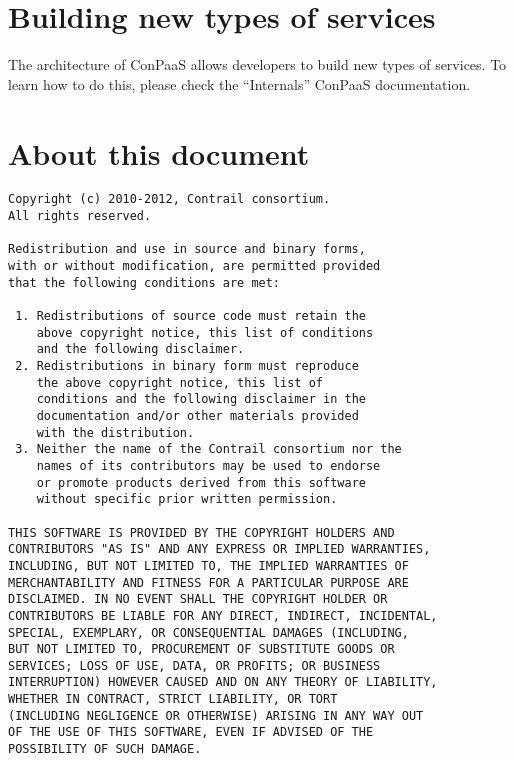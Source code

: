 \documentclass[10pt]{article}
\begin{document}

\section{Building new types of services}

The architecture of ConPaaS allows developers to build new types of
services. To learn how to do this, please check the ``Internals''
ConPaaS documentation.

\section{About this document}

\begin{verbatim}
Copyright (c) 2010-2012, Contrail consortium.
All rights reserved.

Redistribution and use in source and binary forms, 
with or without modification, are permitted provided
that the following conditions are met:

 1. Redistributions of source code must retain the
    above copyright notice, this list of conditions
    and the following disclaimer.
 2. Redistributions in binary form must reproduce
    the above copyright notice, this list of 
    conditions and the following disclaimer in the
    documentation and/or other materials provided
    with the distribution.
 3. Neither the name of the Contrail consortium nor the
    names of its contributors may be used to endorse
    or promote products derived from this software 
    without specific prior written permission.

THIS SOFTWARE IS PROVIDED BY THE COPYRIGHT HOLDERS AND
CONTRIBUTORS "AS IS" AND ANY EXPRESS OR IMPLIED WARRANTIES,
INCLUDING, BUT NOT LIMITED TO, THE IMPLIED WARRANTIES OF
MERCHANTABILITY AND FITNESS FOR A PARTICULAR PURPOSE ARE
DISCLAIMED. IN NO EVENT SHALL THE COPYRIGHT HOLDER OR
CONTRIBUTORS BE LIABLE FOR ANY DIRECT, INDIRECT, INCIDENTAL,
SPECIAL, EXEMPLARY, OR CONSEQUENTIAL DAMAGES (INCLUDING, 
BUT NOT LIMITED TO, PROCUREMENT OF SUBSTITUTE GOODS OR 
SERVICES; LOSS OF USE, DATA, OR PROFITS; OR BUSINESS 
INTERRUPTION) HOWEVER CAUSED AND ON ANY THEORY OF LIABILITY,
WHETHER IN CONTRACT, STRICT LIABILITY, OR TORT
(INCLUDING NEGLIGENCE OR OTHERWISE) ARISING IN ANY WAY OUT
OF THE USE OF THIS SOFTWARE, EVEN IF ADVISED OF THE
POSSIBILITY OF SUCH DAMAGE.
\end{verbatim}
\end{document}
